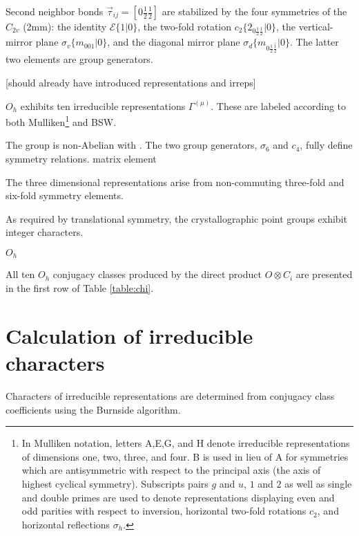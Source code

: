 \documentclass[twocolumn,showpacs,preprintnumbers,superscriptaddress,prb,floatfix,aps,10pt]{revtex4-1}
\newcommand*{\id}{\mathcal{E}}
\newcommand*{\bondvec}{\vec{\tau}_{ij}}
\newcommand{\seitz}[2]{\{#1|#2\}}
\begin{document}
Second neighbor bonds $\bondvec = [0\frac{1}{2}\frac{1}{2}]$ are stabilized by the four symmetries of the $C_{2v}$ (2mm): the identity $\id \seitz{1}{0}$, the two-fold rotation $c_2 \seitz{ 2_{0\frac{1}{2}\frac{1}{2}} }{0}$, the vertical-mirror plane $\sigma_v \seitz{m_{001}}{0}$, and the diagonal mirror plane $\sigma_d \seitz{m_{0\frac{1}{2}\bar{\frac{1}{2}}}}{0}$. The latter two elements are group generators.

[should already have introduced representations and irreps]

$O_h$ exhibits ten irreducible representations $\Gamma^{(\mu)}$. These are labeled according to both Mulliken\footnote{In Mulliken notation, letters A,E,G, and H denote irreducible representations of dimensions one, two, three, and four. B is used in lieu of A for symmetries which are antisymmetric with respect to the principal axis (the axis of highest cyclical symmetry). Subscripts pairs $g$ and $u$, $1$ and $2$ as well as single and double primes are used to denote representations displaying even and odd parities with respect to inversion, horizontal two-fold rotations $c_2$, and horizontal reflections $\sigma_h$.} and BSW.


The group is non-Abelian with . The two group generators, $\sigma_6$ and $c_4$, fully define symmetry relations.
matrix element 


The three dimensional representations arise from non-commuting three-fold and six-fold symmetry elements. 




As required by translational symmetry, the crystallographic point groups exhibit integer characters.





$O_h$



All ten $O_h$ conjugacy classes produced by the direct product $O \otimes C_i$ are presented in the first row of Table \ref{table:chi}.


\section{Calculation of irreducible characters}

Characters of irreducible representations are determined from conjugacy class coefficients using the Burnside algorithm.\cite{burnside_theory_2010,mckay_construction_1970,unger_computing_2006,schneider_dixons_1990,dixon_high_1967} 
\end{document}
